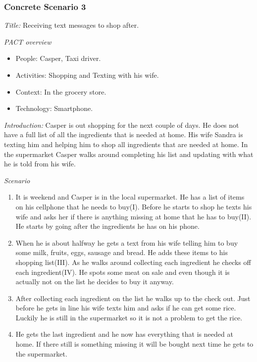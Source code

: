 \subsubsection{Concrete Scenario 3} \label{ConcreteScenario3}

\emph{Title:} Receiving text messages to shop after.

\emph{PACT overview}
\begin{itemize}
\item People: Casper, Taxi driver.  
\item Activities: Shopping and Texting with his wife.
\item Context: In the grocery store.
\item Technology: Smartphone.
\end{itemize}

\emph{Introduction:} Casper is out shopping for the next couple of days. He does not have a full list of all the ingredients that is needed at home. His wife Sandra is texting him and helping him to shop all ingredients that are needed at home. In the supermarket Casper walks around completing his list and updating with what he is told from his wife.  

\emph{Scenario}
\begin{enumerate}
\item It is weekend and Casper is in the local supermarket. He has a list of items on his cellphone that he needs to buy(I). Before he starts to shop he texts his wife and asks her if there is anything missing at home that he has to buy(II). He starts by going after the ingredients he has on his phone.   
\item  When he is about halfway he gets a text from his wife telling him to buy some milk, fruits, eggs, sausage and bread. He adds these items to his shopping list(III). As he walks around collecting each ingredient he checks off each ingredient(IV). He spots some meat on sale and even though it is actually not on the list he decides to buy it anyway.  
\item After collecting each ingredient on the list he walks up to the check out. Just before he gets in line his wife texts him and asks if he can get some rice. Luckily he is still in the supermarket so it is not a problem to get the rice.  
\item He gets the last ingredient and he now has everything that is needed at home. If there still is something missing it will be bought next time he gets to the supermarket.
\end{enumerate}

